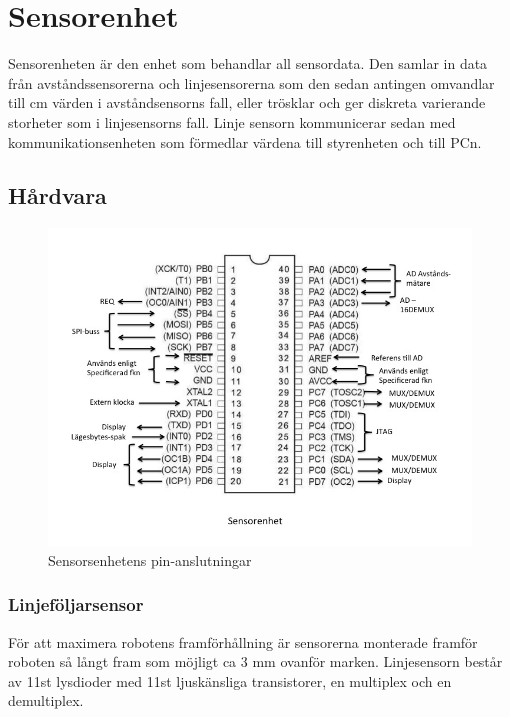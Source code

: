 
\section{Sensorenhet}

Sensorenheten är den enhet som behandlar all sensordata. Den samlar in data från 
avståndssensorerna och linjesensorerna som den sedan antingen omvandlar till 
cm värden i avståndsensorns fall, eller trösklar och ger diskreta varierande storheter 
som i linjesensorns fall. Linje sensorn kommunicerar sedan med kommunikationsenheten
som förmedlar värdena till styrenheten och till PCn.

\subsection{Hårdvara}

\begin{figure}[H]
  \centering
 \includegraphics[angle=0,scale=0.5]{bilder/PIN_sensor.jpg}
  \caption{Sensorsenhetens pin-anslutningar}
  \label{fig:PINsensor}
\end{figure}

\subsubsection{Linjeföljarsensor}
För att maximera robotens framförhållning är sensorerna monterade framför roboten 
så långt fram som möjligt ca 3 mm ovanför marken. Linjesensorn består av 11st lysdioder 
med 11st ljuskänsliga transistorer, en multiplex och en demultiplex.

